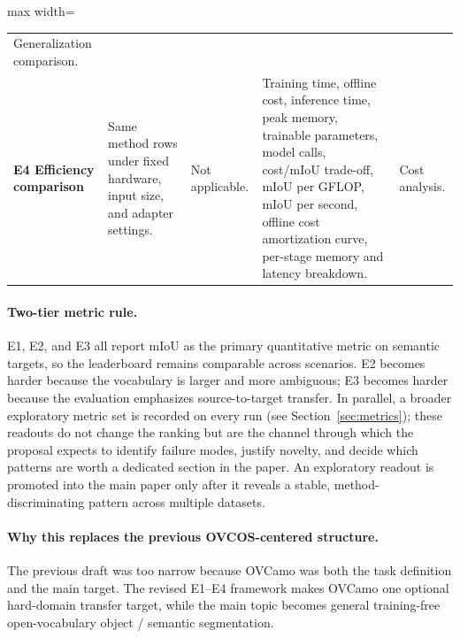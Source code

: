 \documentclass[11pt,a4paper]{article}
\begin{document}
\begin{table}[!htbp]
\begin{adjustbox}{max width=\textwidth}
\begin{tabular}{p{} p{} p{} p{} p{}}
Generalization comparison. \\
\addlinespace[2pt]
\textbf{E4 Efficiency comparison} &
Same method rows under fixed hardware, input size, and adapter settings. &
Not applicable. &
Training time, offline cost, inference time, peak memory, trainable parameters, model calls, cost/mIoU trade-off, mIoU per GFLOP, mIoU per second, offline cost amortization curve, per-stage memory and latency breakdown. &
Cost analysis. \\
\bottomrule
\end{tabular}
\end{adjustbox}
\end{table}

\paragraph{Two-tier metric rule.}
E1, E2, and E3 all report mIoU as the primary quantitative metric on semantic targets, so the leaderboard remains comparable across scenarios. E2 becomes harder because the vocabulary is larger and more ambiguous; E3 becomes harder because the evaluation emphasizes source-to-target transfer. In parallel, a broader exploratory metric set is recorded on every run (see Section~\ref{sec:metrics}); these readouts do not change the ranking but are the channel through which the proposal expects to identify failure modes, justify novelty, and decide which patterns are worth a dedicated section in the paper. An exploratory readout is promoted into the main paper only after it reveals a stable, method-discriminating pattern across multiple datasets.

\paragraph{Why this replaces the previous OVCOS-centered structure.}
The previous draft was too narrow because OVCamo was both the task definition and the main target. The revised E1--E4 framework makes OVCamo one optional hard-domain transfer target, while the main topic becomes general training-free open-vocabulary object / semantic segmentation.
\end{document}
